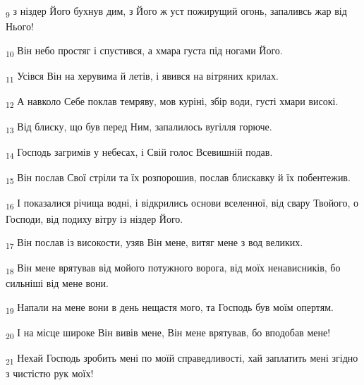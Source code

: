 \begin{tcolorbox}
\textsubscript{9} з ніздер Його бухнув дим, з Його ж уст пожирущий огонь, запаливсь жар від Нього!
\end{tcolorbox}
\begin{tcolorbox}
\textsubscript{10} Він небо простяг і спустився, а хмара густа під ногами Його.
\end{tcolorbox}
\begin{tcolorbox}
\textsubscript{11} Усівся Він на херувима й летів, і явився на вітряних крилах.
\end{tcolorbox}
\begin{tcolorbox}
\textsubscript{12} А навколо Себе поклав темряву, мов куріні, збір води, густі хмари високі.
\end{tcolorbox}
\begin{tcolorbox}
\textsubscript{13} Від блиску, що був перед Ним, запалилось вугілля горюче.
\end{tcolorbox}
\begin{tcolorbox}
\textsubscript{14} Господь загримів у небесах, і Свій голос Всевишній подав.
\end{tcolorbox}
\begin{tcolorbox}
\textsubscript{15} Він послав Свої стріли та їх розпорошив, послав блискавку й їх побентежив.
\end{tcolorbox}
\begin{tcolorbox}
\textsubscript{16} І показалися річища водні, і відкрились основи вселенної, від свару Твойого, о Господи, від подиху вітру із ніздер Його.
\end{tcolorbox}
\begin{tcolorbox}
\textsubscript{17} Він послав із високости, узяв Він мене, витяг мене з вод великих.
\end{tcolorbox}
\begin{tcolorbox}
\textsubscript{18} Він мене врятував від мойого потужного ворога, від моїх ненависників, бо сильніші від мене вони.
\end{tcolorbox}
\begin{tcolorbox}
\textsubscript{19} Напали на мене вони в день нещастя мого, та Господь був моїм опертям.
\end{tcolorbox}
\begin{tcolorbox}
\textsubscript{20} І на місце широке Він вивів мене, Він мене врятував, бо вподобав мене!
\end{tcolorbox}
\begin{tcolorbox}
\textsubscript{21} Нехай Господь зробить мені по моїй справедливості, хай заплатить мені згідно з чистістю рук моїх!
\end{tcolorbox}
